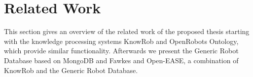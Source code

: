 \documentclass[a4paper,11pt]{article}
\begin{document}

\section{Related Work}
\label{sec:related}
This section gives an overview of the related work of the proposed
thesis starting with the knowledge processing systems KnowRob and
OpenRobots Ontology, which provide similar functionality. Afterwards
we present the Generic Robot Database based on MongoDB and Fawkes and
Open-EASE, a combination of KnowRob and the Generic Robot Database.
\end{document}
